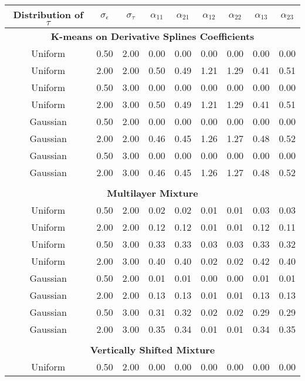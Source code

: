 \begin{table}[ht]
\begin{center}
\begin{tabular}{ccc|cccccc}
  \hline Distribution of $\tau$&$\sigma_{\epsilon}$&$\sigma_{\tau}$&$\alpha_{11}$&$\alpha_{21}$&$\alpha_{12}$&$\alpha_{22}$&$\alpha_{13}$&$\alpha_{23}$\\  \hline\multicolumn{9}{c}{\textbf{K-means on Derivative Splines Coefficients}}\\ Uniform & 0.50 & 2.00 & 0.00 & 0.00 & 0.00 & 0.00 & 0.00 & 0.00 \\ 
  Uniform & 2.00 & 2.00 & 0.50 & 0.49 & 1.21 & 1.29 & 0.41 & 0.51 \\ 
  Uniform & 0.50 & 3.00 & 0.00 & 0.00 & 0.00 & 0.00 & 0.00 & 0.00 \\ 
  Uniform & 2.00 & 3.00 & 0.50 & 0.49 & 1.21 & 1.29 & 0.41 & 0.51 \\ 
  Gaussian & 0.50 & 2.00 & 0.00 & 0.00 & 0.00 & 0.00 & 0.00 & 0.00 \\ 
  Gaussian & 2.00 & 2.00 & 0.46 & 0.45 & 1.26 & 1.27 & 0.48 & 0.52 \\ 
  Gaussian & 0.50 & 3.00 & 0.00 & 0.00 & 0.00 & 0.00 & 0.00 & 0.00 \\ 
  Gaussian & 2.00 & 3.00 & 0.46 & 0.45 & 1.26 & 1.27 & 0.48 & 0.52 \\ 
   \\ \multicolumn{9}{c}{\textbf{Multilayer Mixture}}\\Uniform & 0.50 & 2.00 & 0.02 & 0.02 & 0.01 & 0.01 & 0.03 & 0.03 \\ 
  Uniform & 2.00 & 2.00 & 0.12 & 0.12 & 0.01 & 0.01 & 0.12 & 0.11 \\ 
  Uniform & 0.50 & 3.00 & 0.33 & 0.33 & 0.03 & 0.03 & 0.33 & 0.32 \\ 
  Uniform & 2.00 & 3.00 & 0.40 & 0.40 & 0.02 & 0.02 & 0.42 & 0.40 \\ 
  Gaussian & 0.50 & 2.00 & 0.01 & 0.01 & 0.00 & 0.00 & 0.01 & 0.01 \\ 
  Gaussian & 2.00 & 2.00 & 0.13 & 0.13 & 0.01 & 0.01 & 0.13 & 0.13 \\ 
  Gaussian & 0.50 & 3.00 & 0.31 & 0.32 & 0.02 & 0.02 & 0.29 & 0.29 \\ 
  Gaussian & 2.00 & 3.00 & 0.35 & 0.34 & 0.01 & 0.01 & 0.34 & 0.35 \\ 
   \\ \multicolumn{9}{c}{\textbf{Vertically Shifted Mixture}}\\Uniform & 0.50 & 2.00 & 0.00 & 0.00 & 0.00 & 0.00 & 0.00 & 0.00 \\ 

\end{tabular}
\end{center}
\end{table}
